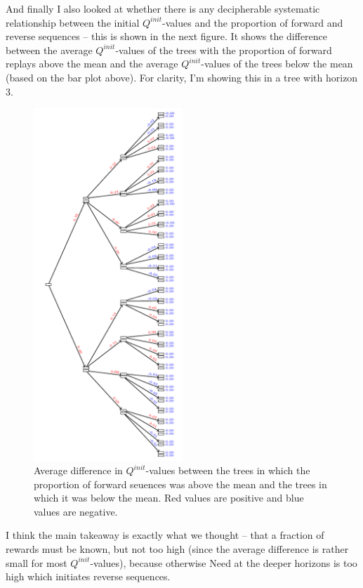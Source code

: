 \documentclass{article}
\begin{document}
And finally I also looked at whether there is any decipherable systematic relationship 
between the initial $Q^{init}$-values and the proportion of forward and reverse sequences -- this 
is shown in the next figure. It shows the difference between the average $Q^{init}$-values 
of the trees with the proportion of forward replays above the mean and the average $Q^{init}$-values 
of the trees below the mean (based on the bar plot above). For clarity, I'm showing this in a tree with horizon $3$.
\newpage

\begin{figure}[h!]
    \centering
    \includegraphics[width=0.5\textwidth]{../figures/init_val_diff.pdf}
    \caption{Average difference in $Q^{init}$-values between the trees in which the proportion of forward seuences was 
    above the mean and the trees in which it was below the mean. Red values are positive and blue values are negative.}
\end{figure}

I think the main takeaway is exactly what we thought -- that a fraction of rewards must be known, but not too high (since the average difference is rather small for most $Q^{init}$-values), because 
otherwise Need at the deeper horizons is too high which initiates reverse sequences.
\end{document}
